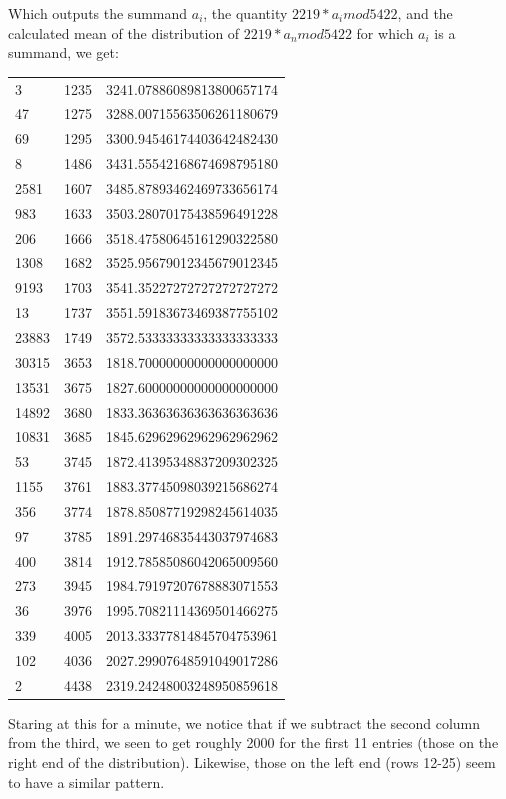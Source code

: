 \documentclass{article}
\theoremstyle{definition}
\theoremstyle{remark}
\numberwithin{equation}{section}
\begin{document}
{Which outputs the summand $a_i$, the quantity $2219*a_i mod 5422$,
and the calculated mean of the distribution of $2219*a_n mod 5422$ for
which $a_i$ is a summand, we get:

\begin{tabular}{lll}
3	&1235	&3241.07886089813800657174\\
47	&1275	&3288.00715563506261180679\\
69	&1295	&3300.94546174403642482430\\
8	&1486	&3431.55542168674698795180\\
2581	&1607	&3485.87893462469733656174\\
983	&1633	&3503.28070175438596491228\\
206	&1666	&3518.47580645161290322580\\
1308	&1682	&3525.95679012345679012345\\
9193	&1703	&3541.35227272727272727272\\
13	&1737	&3551.59183673469387755102\\
23883	&1749	&3572.53333333333333333333\\
30315	&3653	&1818.70000000000000000000\\
13531	&3675	&1827.60000000000000000000\\
14892	&3680	&1833.36363636363636363636\\
10831	&3685	&1845.62962962962962962962\\
53	&3745	&1872.41395348837209302325\\
1155	&3761	&1883.37745098039215686274\\
356	&3774	&1878.85087719298245614035\\
97	&3785	&1891.29746835443037974683\\
400	&3814	&1912.78585086042065009560\\
273	&3945	&1984.79197207678883071553\\
36	&3976	&1995.70821114369501466275\\
339	&4005	&2013.33377814845704753961\\
102	&4036	&2027.29907648591049017286\\
2	&4438	&2319.24248003248950859618
\end{tabular}

Staring at this for a minute, we notice that if we subtract the second
column from the third, we seen to get roughly 2000 for the first 11
entries (those on the right end of the distribution).  Likewise, those
on the left end (rows 12-25) seem to have a similar pattern.

}
\end{document}
